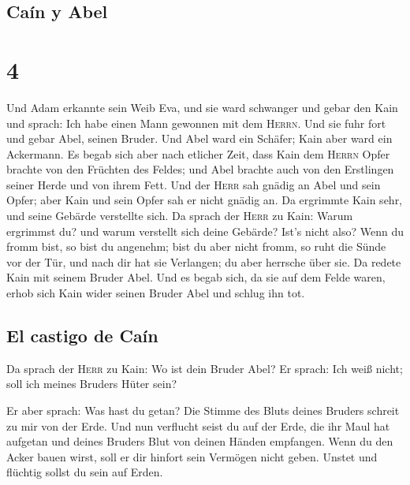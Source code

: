 \hypertarget{cauxedn-y-abel}{%
\subsection{Caín y Abel}\label{cauxedn-y-abel}}

\hypertarget{section-3}{%
\section{4}\label{section-3}}

 Und Adam erkannte sein Weib Eva, und sie ward schwanger
und gebar den Kain und sprach: Ich habe einen Mann gewonnen mit dem
\textsc{Herrn}.  Und sie fuhr fort und gebar Abel, seinen
Bruder. Und Abel ward ein Schäfer; Kain aber ward ein Ackermann.
 Es begab sich aber nach etlicher Zeit, dass Kain dem
\textsc{Herrn} Opfer brachte von den Früchten des Feldes; 
und Abel brachte auch von den Erstlingen seiner Herde und von ihrem
Fett. Und der \textsc{Herr} sah gnädig an Abel und sein Opfer;
 aber Kain und sein Opfer sah er nicht gnädig an. Da
ergrimmte Kain sehr, und seine Gebärde verstellte sich. 
Da sprach der \textsc{Herr} zu Kain: Warum ergrimmst du? und warum
verstellt sich deine Gebärde?  Ist's nicht also? Wenn du
fromm bist, so bist du angenehm; bist du aber nicht fromm, so ruht die
Sünde vor der Tür, und nach dir hat sie Verlangen; du aber herrsche über
sie.  Da redete Kain mit seinem Bruder Abel. Und es begab
sich, da sie auf dem Felde waren, erhob sich Kain wider seinen Bruder
Abel und schlug ihn tot.

\hypertarget{el-castigo-de-cauxedn}{%
\subsection{El castigo de Caín}\label{el-castigo-de-cauxedn}}

 Da sprach der \textsc{Herr} zu Kain: Wo ist dein Bruder
Abel? Er sprach: Ich weiß nicht; soll ich meines Bruders Hüter sein?

 Er aber sprach: Was hast du getan? Die Stimme des Bluts
deines Bruders schreit zu mir von der Erde.  Und nun
verflucht seist du auf der Erde, die ihr Maul hat aufgetan und deines
Bruders Blut von deinen Händen empfangen.  Wenn du den
Acker bauen wirst, soll er dir hinfort sein Vermögen nicht geben. Unstet
und flüchtig sollst du sein auf Erden.

